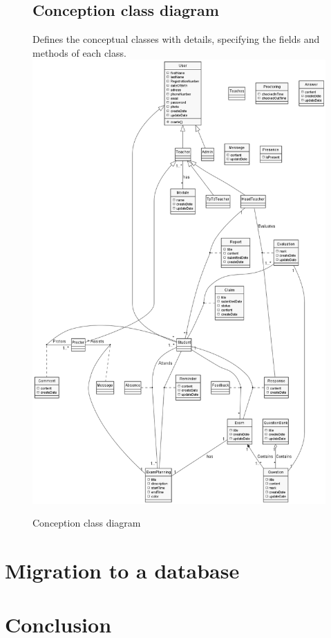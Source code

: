 \documentclass[]{uc2pfecaneva}
\begin{document}
    \begin{figure}
        \subsection{Conception class diagram}
        \raggedright Defines the conceptual classes with details, specifying the fields and methods of each class.
        \linebreak
        \includegraphics[width=\textwidth]{images/CCD}
        \caption{Conception class diagram}
    \end{figure}
    \clearpage

    \raggedright\section{Migration to a database}
    \raggedright\section{Conclusion}
\end{document}
